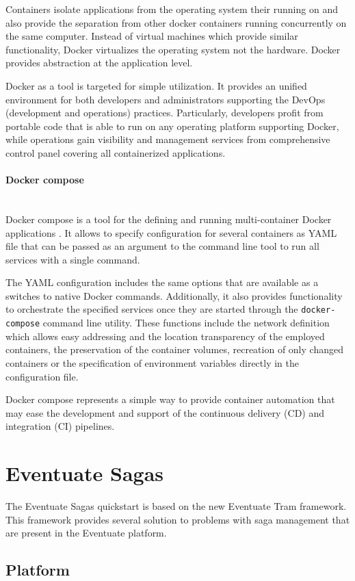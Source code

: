 \documentclass[oneside,
  digital, %
  table,   %
  nolof,     %
  nolot,     %
]{fithesis3}
\newcommand{\newlinepar}[1]{\paragraph{#1}\needspace{4\baselineskip}\mbox{}\\}
\begin{document}
Containers isolate applications from the operating system their running on and also provide the separation from other docker containers running concurrently on the same computer. Instead of virtual machines which provide similar functionality, Docker virtualizes the operating system not the hardware. Docker provides abstraction at the application level.

Docker as a tool is targeted for simple utilization. It provides an unified environment for both developers and administrators supporting the DevOps (development and operations) practices. Particularly, developers profit from portable code that is able to run on any operating platform supporting Docker, while operations gain visibility and management services from comprehensive control panel covering all containerized applications.

\newlinepar{Docker compose}

Docker compose is a tool for the defining and running multi-container Docker applications \cite{docker_compose}. It allows to specify configuration for several containers as YAML file that can be passed as an argument to the command line tool to run all services with a single command.

The YAML configuration includes the same options that are available as a switches to native Docker commands. Additionally, it also provides functionality to orchestrate the specified services once they are started through the \texttt{docker-compose} command line utility. These functions include the network definition which allows easy addressing and the location transparency of the employed containers, the preservation of the container volumes, recreation of only changed containers or the specification of environment variables directly in the configuration file. 

Docker compose represents a simple way to provide container automation that may ease the development and support of the continuous delivery (CD) and integration (CI) pipelines.

\section{Eventuate Sagas}

The Eventuate Sagas quickstart is based on the new Eventuate Tram framework. This framework provides several solution to problems with saga management that are present in the Eventuate platform.

\subsection{Platform}
\end{document}
